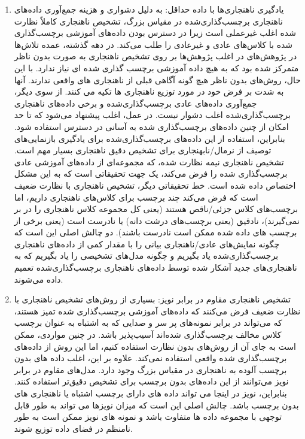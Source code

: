 \documentclass[12pt,a4paper]{report}
\begin{document}
\begin{enumerate}
\item {
	یادگیری ناهنجاری‌ها با داده حداقل:
به دلیل دشواری و هزینه جمع‌آوری داده‌های ناهنجاری برچسب‌گذاری‌شده در مقیاس بزرگ، تشخیص ناهنجاری کاملاً نظارت شده اغلب غیرعملی است زیرا در دسترس بودن داده‌های آموزشی برچسب‌گذاری شده با کلاس‌های عادی و غیرعادی را طلب می‌کند. در دهه گذشته، عمده تلاش‌ها در پژوهش‌های در اغلب پژوهش‌ها بر روی تشخیص ناهنجاری به صورت بدون ناظر متمرکز شده بود که به هیچ داده آموزشی برچسب گذاری شده ای نیاز ندارد. با این حال، روش‌های بدون ناظر هیچ گونه آگاهی قبلی از ناهنجاری های واقعی ندارند. آنها به شدت بر فرض خود در مورد توزیع ناهنجاری ها تکیه می کنند. از سوی دیگر، جمع‌آوری داده‌های عادی برچسب‌گذاری‌شده و برخی داده‌های ناهنجاری برچسب‌گذاری‌شده اغلب دشوار نیست. در عمل، اغلب پیشنهاد می‌شود که تا حد امکان از چنین داده‌های برچسب‌گذاری شده به آسانی در دسترس استفاده شود\cite{2}. بنابراین، استفاده از این داده‌های برچسب‌گذاری‌شده برای یادگیری بازنمایی‌های توصیف از نرمال/نابهنجاری برای تشخیص دقیق ناهنجاری بسیار مهم است. تشخیص ناهنجاری نیمه نظارت شده، که مجموعه‌ای از داده‌های آموزشی عادی برچسب‌گذاری شده را فرض می‌کند، یک جهت تحقیقاتی است که به این مشکل اختصاص داده شده است. خط تحقیقاتی دیگر، تشخیص ناهنجاری با نظارت ضعیف است که فرض می‌کند چند برچسب برای کلاس‌های ناهنجاری داریم، اما برچسب‌های کلاس جزئی/ناقص هستند (یعنی کل مجموعه کلاس ناهنجاری را در بر نمی‌گیرند)، نادقیق (یعنی برچسب‌های درشت دانه) یا نادرست است (یعنی برخی از برچسب های داده شده ممکن است نادرست باشند). دو چالش اصلی این است که چگونه نمایش‌های عادی/ناهنجاری بیانی را با مقدار کمی از داده‌های ناهنجاری برچسب‌گذاری‌شده یاد بگیریم و چگونه مدل‌های تشخیصی را یاد بگیریم که به ناهنجاری‌های جدید آشکار شده توسط داده‌های ناهنجاری برچسب‌گذاری‌شده تعمیم داده می‌شوند.

}

\item{
تشخیص ناهنجاری مقاوم در برابر نویز:
بسیاری از روش‌های تشخیص ناهنجاری با نظارت ضعیف فرض می‌کنند که داده‌های آموزشی برچسب‌گذاری شده تمیز هستند، که می‌تواند در برابر نمونه‌های پر سر و صدایی که به اشتباه به عنوان برچسب کلاس مخالف برچسب‌گذاری شده‌اند آسیب‌پذیر باشد. در چنین مواردی، ممکن است به جای آن از روش‌های بدون نظارت استفاده کنیم، اما این روش از داده‌های برچسب‌گذاری شده واقعی استفاده نمی‌کند. علاوه بر این، اغلب داده های بدون برچسب آلوده به ناهنجاری در مقیاس بزرگ وجود دارد. مدل‌های مقاوم در برابر نویز می‌توانند از این داده‌های بدون برچسب برای تشخیص دقیق‌تر استفاده کنند. بنابراین، نویز در اینجا می تواند داده های دارای برچسب اشتباه یا ناهنجاری های بدون برچسب باشد. چالش اصلی این است که میزان نویزها می تواند به طور قابل توجهی با مجموعه داده ها متفاوت باشد و نمونه های نویز ممکن است به طور نامنظم در فضای داده توزیع شوند.

}
\end{enumerate}
\end{document}
